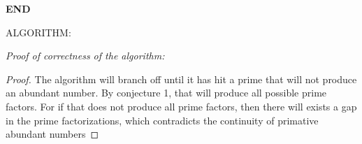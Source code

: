 \documentclass[../paper.tex]{subfiles}
\begin{document}
\textbf{END}


ALGORITHM:



\textit{Proof of correctness of the algorithm:}
\begin{proof}
The algorithm will branch off until it has hit a
prime that will not produce an abundant number. By
conjecture 1, that will produce all possible prime factors. 
For if that does not produce all prime factors, then there will
exists a gap in the prime factorizations, which contradicts the
continuity of primative abundant numbers

\end{proof}
\end{document}

